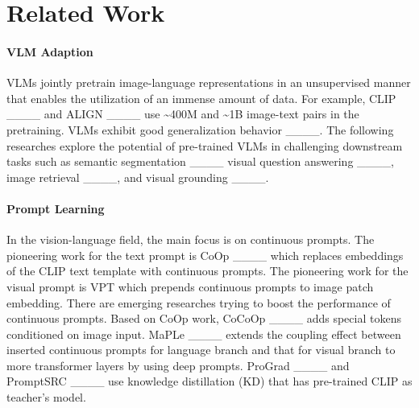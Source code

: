 \section{Related Work}
\label{sec:work_relate}


\paragraph{VLM Adaption} VLMs jointly pretrain image-language representations in an unsupervised manner that enables the utilization of an immense amount of data. For example, CLIP ____ and ALIGN ____ use \textasciitilde400M and \textasciitilde1B image-text pairs in the pretraining. VLMs exhibit good generalization behavior ____. The following researches explore the potential of pre-trained VLMs in challenging downstream tasks such as semantic segmentation ____ visual question answering ____, image retrieval ____, and visual grounding ____.

\paragraph{Prompt Learning} In the vision-language field, the main focus is on continuous prompts. The pioneering work for the text prompt is CoOp ____ which replaces embeddings of the CLIP text template with continuous prompts. The pioneering work for the visual prompt is VPT which prepends continuous prompts to image patch embedding. There are emerging researches trying to boost the performance of continuous prompts. Based on CoOp work, CoCoOp ____ adds special tokens conditioned on image input. MaPLe ____ extends the coupling effect between inserted continuous prompts for language branch and that for visual branch to more transformer layers by using deep prompts. ProGrad ____ and PromptSRC ____ use knowledge distillation (KD) that has pre-trained CLIP as teacher's model.